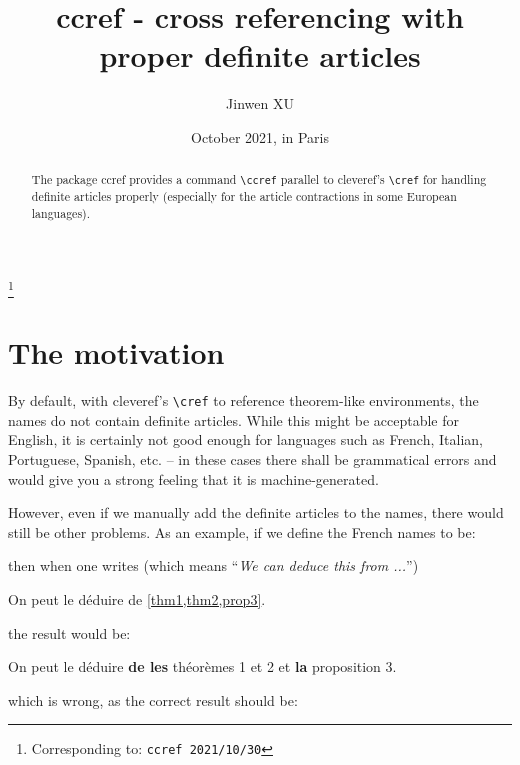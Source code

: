 \documentclass[classical]{einfart}
\newenvironment{demo}{%
    \LocallyStopLineNumbers%
    \begin{tcolorbox}[enhanced jigsaw,pad at break*=1mm,breakable,
        left=4mm,right=4mm,top=0.5mm,bottom=0mm,
        colback=gray!5!paper,boxrule=0pt,frame hidden,
        borderline west={1.5mm}{0mm}{gray!55!paper},arc=.7mm]%
}{\end{tcolorbox}\ResumeLineNumbers}
\newcommand{\ccrefpackage}{\textsf{ccref}}
\begin{document}
\title{\ccrefpackage{} - cross referencing with proper definite articles}
\author{Jinwen XU}
\thanks{Corresponding to: \texttt{\ccrefpackage{} 2021/10/30}}
\date{October 2021, in Paris}

\maketitle

\begin{abstract}
    \raggedleft
    The package \ccrefpackage{} provides a command \lstinline|\ccref| parallel to \textsf{cleveref}'s \lstinline|\cref| for handling definite articles properly (especially for the article contractions in some European languages).
\end{abstract}

\section{The motivation}

By default, with \textsf{cleveref}'s \lstinline|\cref| to reference theorem-like environments, the names do not contain definite articles. While this might be acceptable for English, it is certainly not good enough for languages such as French, Italian, Portuguese, Spanish, etc. -- in these cases there shall be grammatical errors and would give you a strong feeling that it is machine-generated.

However, even if we manually add the definite articles to the names, there would still be other problems. As an example, if we define the French names to be:

\begin{code}
\end{code}

then when one writes (which means ``\emph{We can deduce this from ...}'')

\begin{code}
On peut le déduire de \cref{thm1,thm2,prop3}.
\end{code}

the result would be:

\begin{demo}
    On peut le déduire \textbf{de les} théorèmes 1 et 2 et \textbf{la} proposition 3.
\end{demo}

which is wrong, as the correct result should be:
\end{document}
